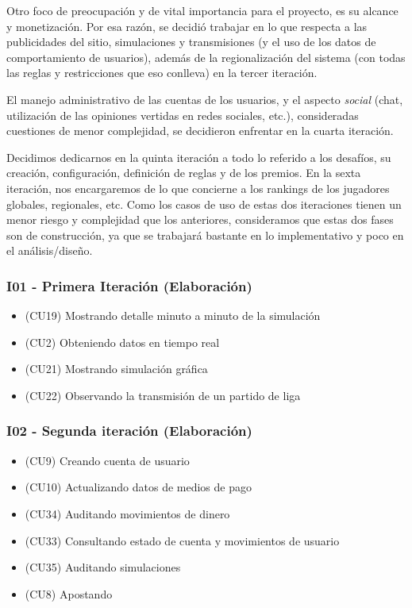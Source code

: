 Otro foco de preocupación y de vital importancia para el proyecto, es su alcance y monetización. Por esa razón, se decidió trabajar en lo que respecta a las publicidades del sitio, simulaciones y transmisiones (y el uso de los datos de comportamiento de usuarios), además de la regionalización del sistema (con todas las reglas y restricciones que eso conlleva) en la tercer iteración.

El manejo administrativo de las cuentas de los usuarios, y el aspecto \emph{social} (chat, utilización de las opiniones vertidas en redes sociales, etc.), consideradas cuestiones de menor complejidad, se decidieron enfrentar en la cuarta iteración.

Decidimos dedicarnos en la quinta iteración a todo lo referido a los desafíos, su creación, configuración, definición de reglas y de los premios. En la sexta iteración, nos encargaremos de lo que concierne a los rankings de los jugadores globales, regionales, etc. Como los casos de uso de estas dos iteraciones tienen un menor riesgo y complejidad que los anteriores, consideramos que estas dos fases son de construcción, ya que se trabajará bastante en lo implementativo y poco en el análisis/diseño.



\subsubsection{I01 - Primera Iteración (Elaboración)}
\begin{itemize}
\item (CU19) Mostrando detalle minuto a minuto de la simulación
\item (CU2)  Obteniendo datos en tiempo real
\item (CU21) Mostrando simulación gráfica
\item (CU22) Observando la transmisión de un partido de liga
\end{itemize}

\subsubsection{I02 - Segunda iteración (Elaboración)} 
\begin{itemize}
\item (CU9) Creando cuenta de usuario
\item (CU10) Actualizando datos de medios de pago
\item (CU34) Auditando movimientos de dinero
\item (CU33) Consultando estado de cuenta y movimientos de usuario
\item (CU35) Auditando simulaciones
\item (CU8) Apostando
\end{itemize}


